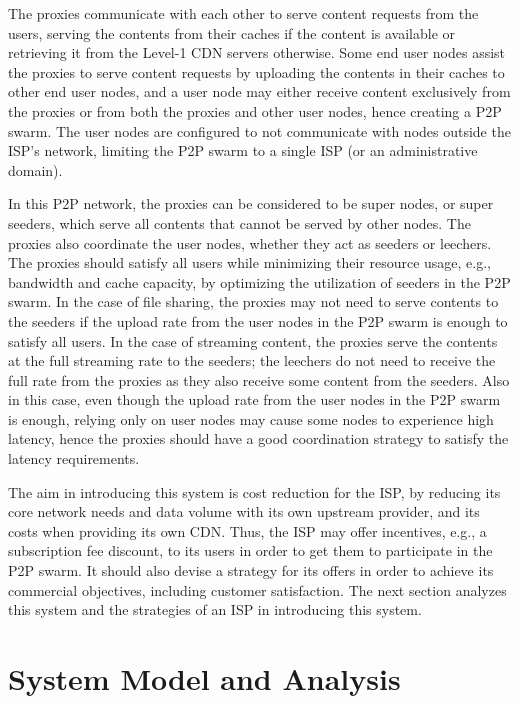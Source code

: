 \documentclass[paper]{ieice}
\begin{document}
The proxies communicate with each other to serve content requests from the users, serving the contents from their caches if the content is available 
or retrieving it from the Level-1 CDN servers otherwise.
Some end user nodes assist the proxies to serve content requests by
uploading the contents in their caches to other end user nodes, and a
user node may either receive content exclusively from the proxies or
from both the proxies and other user nodes, hence creating a P2P swarm.
The user nodes are configured to not communicate with nodes outside
the ISP's network, limiting the P2P swarm to a single ISP (or an administrative domain).

In this P2P network, the proxies can be considered to be super nodes,
or super seeders, which serve all contents that cannot be served by
other nodes.  The proxies also coordinate the user nodes, whether they
act as seeders or leechers.  The proxies should satisfy all users
while minimizing their resource usage, e.g., bandwidth and cache
capacity, by optimizing the utilization of seeders in the P2P swarm.
In the case of file sharing, the proxies may not need to serve
contents to the seeders if the upload rate from the user nodes in the
P2P swarm is enough to satisfy all users.  In the case of streaming
content, the proxies serve the contents at the full streaming rate to
the seeders; the leechers do not need to receive the full rate from
the proxies as they also receive some content from the seeders.  Also
in this case, even though the upload rate from the user nodes in the
P2P swarm is enough, relying only on user nodes may cause some nodes
to experience high latency, hence the proxies should have a good
coordination strategy to satisfy the latency requirements.

The aim in introducing this system is cost reduction for the ISP, by
reducing its core network needs and data volume with its own upstream
provider, and its costs when providing its own CDN.  Thus, the ISP may
offer incentives, e.g., a subscription fee discount, to its users in
order to get them to participate in the P2P swarm.  It should also
devise a strategy for its offers in order to achieve its commercial
objectives, including customer satisfaction.  The next section
analyzes this system and the strategies of an ISP in introducing this
system.

  
 
\section{System Model and Analysis}\label{systemmodel}
\end{document}
